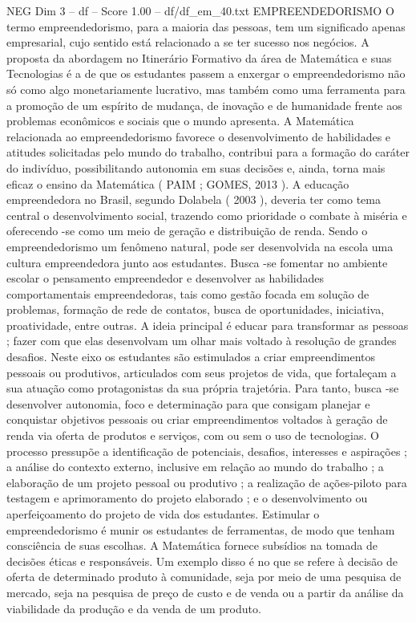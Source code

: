 \begin{textsample}{NEG Dim 3 – df – Score 1.00 – df/df\_em\_40.txt}  \label{ex:f3_neg_167}
EMPREENDEDORISMO O termo empreendedorismo, para a maioria das pessoas, tem um significado apenas empresarial, cujo sentido está relacionado a se ter sucesso nos negócios.
A proposta da abordagem no Itinerário Formativo da área de Matemática e suas Tecnologias é a de que os estudantes passem a enxergar o empreendedorismo não só como algo monetariamente lucrativo, mas também como uma ferramenta para a promoção de um espírito de mudança, de inovação e de humanidade frente aos problemas econômicos e sociais que o mundo apresenta.
A Matemática relacionada ao empreendedorismo favorece o desenvolvimento de habilidades e atitudes solicitadas pelo mundo do trabalho, contribui para a formação do caráter do indivíduo, possibilitando autonomia em suas decisões e, ainda, torna mais eficaz o ensino da Matemática ( PAIM ; GOMES, 2013 ).
A educação empreendedora no Brasil, segundo Dolabela ( 2003 ), deveria ter como tema central o desenvolvimento social, trazendo como prioridade o combate à miséria e oferecendo -se como um meio de geração e distribuição de renda.
Sendo o empreendedorismo um fenômeno natural, pode ser desenvolvida na escola uma cultura empreendedora junto aos estudantes.
Busca -se fomentar no ambiente escolar o pensamento empreendedor e desenvolver as habilidades comportamentais empreendedoras, tais como gestão focada em solução de problemas, formação de rede de contatos, busca de oportunidades, iniciativa, proatividade, entre outras.
A ideia principal é educar para transformar as pessoas ; fazer com que elas desenvolvam um olhar mais voltado à resolução de grandes desafios.
Neste eixo os estudantes são estimulados a criar empreendimentos pessoais ou produtivos, articulados com seus projetos de vida, que fortaleçam a sua atuação como protagonistas da sua própria trajetória.
Para tanto, busca -se desenvolver autonomia, foco e determinação para que consigam planejar e conquistar objetivos pessoais ou criar empreendimentos voltados à geração de renda via oferta de produtos e serviços, com ou sem o uso de tecnologias.
O processo pressupõe a identificação de potenciais, desafios, interesses e aspirações ; a análise do contexto externo, inclusive em relação ao mundo do trabalho ; a elaboração de um projeto pessoal ou produtivo ; a realização de ações-piloto para testagem e aprimoramento do projeto elaborado ; e o desenvolvimento ou aperfeiçoamento do projeto de vida dos estudantes.
Estimular o empreendedorismo é munir os estudantes de ferramentas, de modo que tenham consciência de suas escolhas.
A Matemática fornece subsídios na tomada de decisões éticas e responsáveis.
Um exemplo disso é no que se refere à decisão de oferta de determinado produto à comunidade, seja por meio de uma pesquisa de mercado, seja na pesquisa de preço de custo e de venda ou a partir da análise da viabilidade da produção e da venda de um produto.

\end{textsample}
